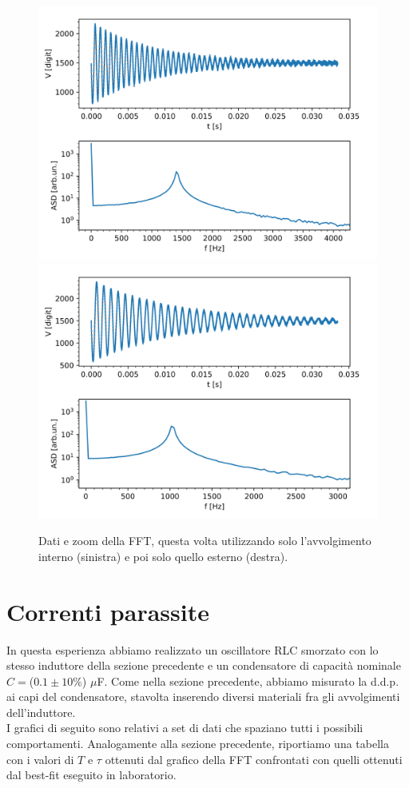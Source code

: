 \documentclass{article}[a4paper, oneside,11pt]
\begin{document}
\begin{figure}[H]
    \centering
    \includegraphics[width=0.48\columnwidth]{img/ese12/ind_int.png}
    \includegraphics[width=0.48\columnwidth]{img/ese12/ind_est.png}
    \caption{Dati e zoom della FFT, questa volta utilizzando solo l'avvolgimento interno (sinistra) e poi solo quello esterno (destra).}
    \label{fig:ese12 - Induttanza avvolgimente interno ed esterno}
\end{figure}

\section{Correnti parassite}
In questa esperienza abbiamo realizzato un oscillatore RLC smorzato con lo stesso induttore della sezione precedente e un condensatore di capacità nominale $C = $($0.1  \pm 10 \%$) $\mu$F. Come nella sezione precedente, abbiamo misurato la d.d.p. ai capi del condensatore, stavolta inserendo diversi materiali fra gli avvolgimenti dell'induttore.\\
I grafici di seguito sono relativi a set di dati che spaziano tutti i possibili comportamenti. Analogamente alla sezione precedente, riportiamo una tabella con i valori di $T$ e $\tau$ ottenuti dal grafico della FFT confrontati con quelli ottenuti dal best-fit eseguito in laboratorio.\\
\end{document}
